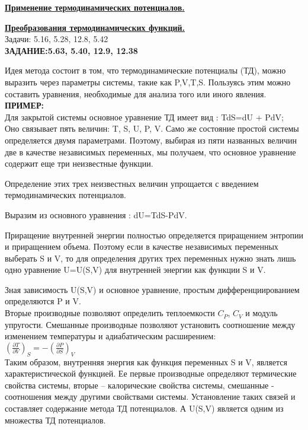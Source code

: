 \documentclass[12pt]{article}
\begin{document}
{\underline{\bf Применение термодинамических потенциалов. }

{\underline{\bf Преобразования термодинамических функций.}\\

Задачи: 5.16, 5.28, 12.8, 5.42  \\

{\bf ЗАДАНИЕ:5.63, 5.40, 12.9, 12.38}

\vspace{0.5cm}

Идея метода состоит в том, что  термодинамические потенциалы (ТД), можно выразить через параметры системы, такие как P,V,T,S.  Пользуясь этим можно составить уравнения, необходимые для анализа того или иного явления.\\

{\bf ПРИМЕР:}\\

Для закрытой системы основное уравнение ТД имеет вид  : TdS=dU + PdV;\\

Оно связывает пять величин: T, S, U, P, V. Само же состояние простой системы определяется двумя параметрами. Поэтому, выбирая из пяти названных величин две в качестве независимых переменных, мы получаем, что основное уравнение содержит еще три неизвестные функции. 

Определение этих трех неизвестных величин упрощается с введением термодинамических потенциалов.

Выразим из основного уравнения  : dU=TdS-PdV. 

Приращение внутренней энергии полностью определяется приращением энтропии и приращением объема. Поэтому если  в качестве независимых переменных выберать S и V, то для определения других трех переменных нужно знать лишь одно уравнение U=U(S,V) для внутренней энергии как функции S и V.

Зная зависимость U(S,V) и основное уравнение, простым дифференциированием определяются P и V. \\

Вторые производные позволяют определить теплоемкости $C_P$, $C_V$ и модуль упругости. Смешанные производные позволяют установить соотношение между изменением температуры и адиабатическим расширением:\\

$\left( \frac{\partial T}{\partial V}\right)_S=-\left( \frac{\partial P}{\partial S}\right)_V$\\

Таким образом, внутренняя энергия  как функция переменных S и V, является характеристической функцией. Ее первые производные определяют термические свойства системы, вторые – калорические свойства системы, смешанные - соотношения между другими свойствами системы. Установление таких связей и составляет содержание метода ТД потенциалов. А U(S,V) является одним из множества ТД потенциалов.\\

}}
\end{document}
